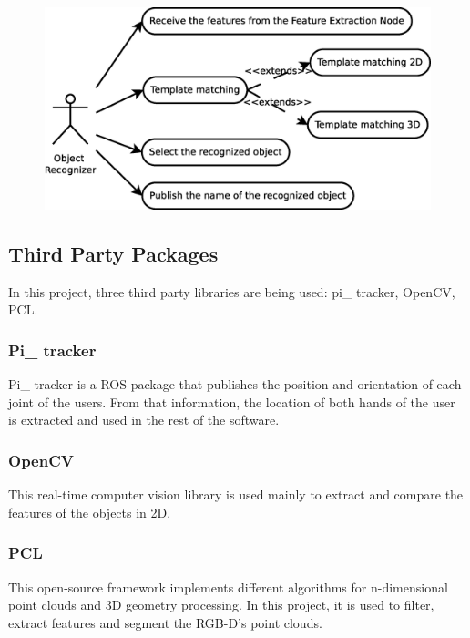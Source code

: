 \documentclass{article}
\begin{document}
\begin{figure}[H]
\begin{center}
	\includegraphics[scale=0.4]{../../img/diagrams/uc_recognizer.eps}
\end{center}
\end{figure}


\subsection{Third Party Packages}
\hspace{0.5cm}In this project, three third party libraries are being used: pi\_ tracker, OpenCV, PCL. 
\subsubsection{ Pi\_ tracker}
Pi\_ tracker is a ROS package that publishes the position and orientation of each joint of the users. From that information, the location of both hands of the user is extracted and used in the rest of the software. 
\subsubsection{ OpenCV}
This real-time computer vision library is used mainly to extract and compare the features of the objects in 2D. 
\subsubsection{PCL}
This open-source framework implements different algorithms for n-dimensional point clouds and 3D geometry processing.
In this project, it is used to filter, extract features and segment the RGB-D's point clouds.
\end{document}
